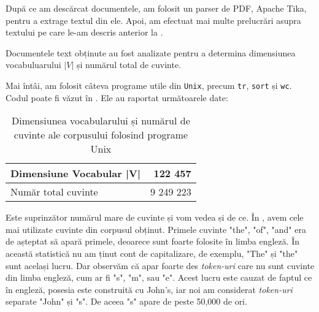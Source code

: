 După ce am descărcat documentele, am folosit un parser de PDF, Apache Tika, pentru a extrage textul din ele. Apoi, am efectuat mai multe prelucrări asupra textului pe care le-am descris anterior la .

Documentele text obținute au fost analizate pentru a determina dimensiunea vocabuluarului $|V|$ și numărul total de cuvinte.

Mai întâi, am folosit câteva programe utile din \texttt{Unix}, precum \texttt{tr}, \texttt{sort} și \texttt{wc}. Codul poate fi văzut în . Ele au raportat următoarele date:

\begin{center}
\begin{table}[htb]
  \caption{Dimensiunea vocabularului și numărul de cuvinte ale corpusului folosind programe Unix}
  \begin{tabular}{|l|r|}
    \hline
    Dimensiune Vocabular |V| & 122 457\\
    \hline
    Număr total cuvinte & 9 249 223 \\
     \hline
  \end{tabular}
  \label{table:vocabulary-size-bash}
\end{table}
\end{center}


\lstset{language=bash}
\lstset{caption=Comenzile Unix folosite pentru determinarea vocabularului, label=lst:vocabulary-size-bash}


Este suprinzător numărul mare de cuvinte și vom vedea și de ce. În , avem cele mai utilizate cuvinte din corpusul obținut. Primele cuvinte "the", "of", "and" era de așteptat să apară primele, deoarece sunt foarte folosite în limba engleză. În această statistică nu am ținut cont de capitalizare, de exemplu, "The" și "the" sunt același lucru. Dar observăm că apar foarte des \textit{token-uri} care nu sunt cuvinte din limba engleză, cum ar fi "s", "m", sau "e". Acest lucru este cauzat de faptul ce în engleză, posesia este construită cu John's, iar noi am considerat \textit{token-uri} separate "John" și "s". De aceea "s" apare de peste 50,000 de ori.

\lstset{language=make}
\lstset{caption=Cele mai folosite cuvinte din limba engleză pentru corpusul obținut folosind programe Unix, label=lst:top-words-bash}


